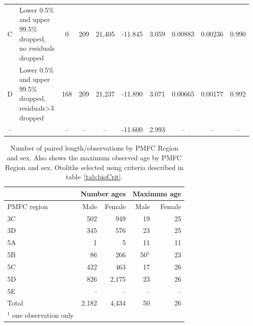 \begin{table}[b]
\begin{tabular}{clcccccccc}
C & \specialcell{Lower 0.5\% and upper 99.5\%\\dropped, no residuals dropped} & 0 & 209 & 21,405 & -11.845 & 3.059 & 0.00883 & 0.00236 & 0.990 \\
D & \specialcell{Lower 0.5\% and upper 99.5\%\\dropped, residuals\textgreater3 dropped} & 168 & 209 & 21,237 & -11.890 & 3.071 & 0.00665 & 0.00177 & 0.992 \\
-- & \citet{arf2001} & -- & -- & -- & -11.600 & 2.993 & -- & -- & -- \\
\hline
\end{tabular}
\end{table}

\begin{table}[b]
\centering
\caption{\label{tab:numagesByArea} Number of paired length/observations by PMFC Region and sex. Also shows the maximum observed age by PMFC Region and sex.  Otoliths selected using criteria described in table~\ref{tab:bioCrit}.}
\begin{tabular}{lrrrr}
\hline
            & \multicolumn{2}{c}{Number ages} & \multicolumn{2}{c}{Maximum age} \\
\hline
PMFC region &  Male & Female &   Male & Female \\
\hline
3C          &   502 &    949 &     19 &     25 \\
3D          &   345 &    576 &     23 &     25 \\
5A          &     1 &      5 &     11 &     11 \\
5B          &    86 &    266 & 50$^1$ &     23 \\
5C          &   422 &    463 &     17 &     26 \\
5D          &   826 &  2,175 &     23 &     26 \\
5E          &    -- &     -- &     -- &     -- \\
Total       & 2,182 &  4,434 &     50 &     26 \\
$^1$ one observation only \\
\hline
\end{tabular}
\end{table}


